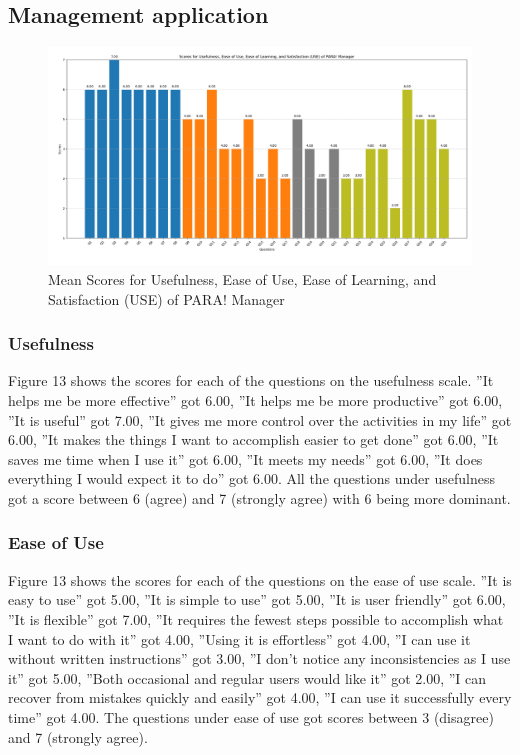 \documentclass{icsthesis}
\begin{document}
\begin{mainmatter}
		\subsection{Management application}
		\begin{figure}[h]
			\centering
				\includegraphics[scale=0.18]{./figures/manager means.png}
			\caption{Mean Scores for Usefulness, Ease of Use, Ease of Learning, and Satisfaction (USE) of PARA! Manager}
		\end{figure}
		\subsubsection{Usefulness}
		Figure 13 shows the scores for each of the questions on the usefulness scale.
		”It helps me be more effective” got 6.00, ”It helps me be more productive” got 6.00, ”It is useful” got 7.00, ”It gives me more control over the activities in my life” got 6.00, ”It makes the things I want to accomplish easier to get done” got 6.00, ”It saves me time when I use it” got 6.00, ”It meets my needs” got 6.00, ”It does everything I would expect it to do” got 6.00.
		All the questions under usefulness got a score between 6 (agree) and 7 (strongly agree) with 6 being more dominant.
		\subsubsection{Ease of Use}
		Figure 13 shows the scores for each of the questions on the ease of use scale. ”It is easy to use” got 5.00, ”It is simple to use” got 5.00, ”It is user friendly” got 6.00, ”It is flexible” got 7.00, ”It requires the fewest steps possible to accomplish what I want to do with it” got 4.00, ”Using it is effortless” got 4.00, ”I can use it without written instructions” got 3.00, ”I don’t notice any inconsistencies as I use it” got 5.00, ”Both occasional and regular users would like it” got 2.00, ”I can recover from mistakes quickly and easily” got 4.00, ”I can use it successfully every time” got 4.00.
		The questions under ease of use got scores between 3 (disagree) and 7 (strongly agree).

\end{mainmatter}
\end{document}
